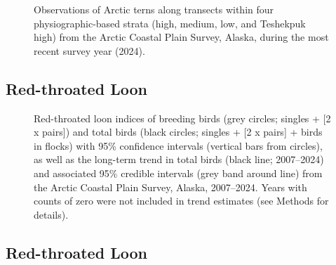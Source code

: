 \documentclass[
]{article}
\begin{document}
\begin{figure}


\caption{\label{fig-ARTEmap}Observations of Arctic terns along transects
within four physiographic-based strata (high, medium, low, and Teshekpuk
high) from the Arctic Coastal Plain Survey, Alaska, during the most
recent survey year (2024).}

\end{figure}%

\newpage{}

\subsection*{Red-throated Loon}\label{red-throated-loon}

\begin{figure}


\caption{\label{fig-RTLO}Red-throated loon indices of breeding birds
(grey circles; singles + {[}2 x pairs{]}) and total birds (black
circles; singles + {[}2 x pairs{]} + birds in flocks) with 95\%
confidence intervals (vertical bars from circles), as well as the
long-term trend in total birds (black line; 2007--2024) and associated
95\% credible intervals (grey band around line) from the Arctic Coastal
Plain Survey, Alaska, 2007--2024. Years with counts of zero were not
included in trend estimates (see Methods for details).}

\end{figure}%

\newpage{}

\subsection*{Red-throated Loon}\label{red-throated-loon-1}

\begingroup\fontsize{10}{12}\selectfont
\end{document}
